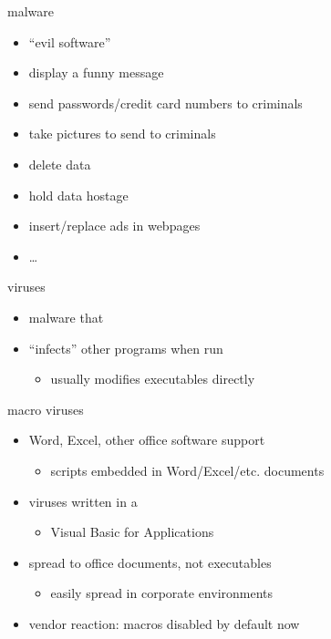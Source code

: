 
\begin{frame}{malware}
    \begin{itemize}
    \item ``evil software''
    \item<2-> display a funny message
    \item<2-> send passwords/credit card numbers to criminals
    \item<2-> take pictures to send to criminals
    \item<2-> delete data
    \item<2-> hold data hostage
    \item<2-> insert/replace ads in webpages
    \item<2-> \ldots
    \end{itemize}
\end{frame}


\begin{frame}{viruses}
    \begin{itemize}
    \item malware that 
    \item ``infects'' other programs when run
    \begin{itemize}
    \item usually modifies executables directly
    \end{itemize}
    \end{itemize}
\end{frame}

\begin{frame}{macro viruses}
    \begin{itemize}
    \item Word, Excel, other office software support 
        \begin{itemize}
        \item scripts embedded in Word/Excel/etc. documents
        \end{itemize}
    \item viruses written in a  
        \begin{itemize}
        \item Visual Basic for Applications
        \end{itemize}
    \item spread to office documents, not executables
        \begin{itemize}
        \item easily spread in corporate environments
        \end{itemize}
    \item vendor reaction: macros disabled by default now
    \end{itemize}
\end{frame}


